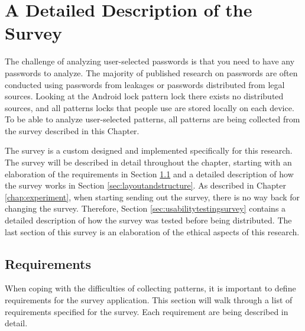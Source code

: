 \chapter{A Detailed Description of the Survey}\label{sec:survey}
  
  The challenge of analyzing user-selected passwords is that you need to have any passwords to analyze. The majority of published research on passwords are often conducted using passwords from leakages or passwords distributed from legal sources. Looking at the Android lock pattern lock there exists no distributed sources, and all patterns locks that people use are stored locally on each device. To be able to analyze user-selected patterns, all patterns are being collected from the survey described in this Chapter. 

  The survey is a custom designed and implemented specifically for this research. The survey will be described in detail throughout the chapter, starting with an elaboration of the requirements in Section \ref{sec:requirementstosurvey} and a detailed description of how the survey works in Section \ref{sec:layoutandstructure}. As described in Chapter \ref{chap:experiment}, when starting sending out the survey, there is no way back for changing the survey. Therefore, Section \ref{sec:usabilitytestingsurvey} contains a detailed description of how the survey was tested before being distributed. The last section of this survey is an elaboration of the ethical aspects of this research. 

  \clearpage
  \section{Requirements}\label{sec:requirementstosurvey}

    When coping with the difficulties of collecting patterns, it is important to define requirements for the survey application. This section will walk through a list of requirements specified for the survey. Each requirement are being described in detail. 

